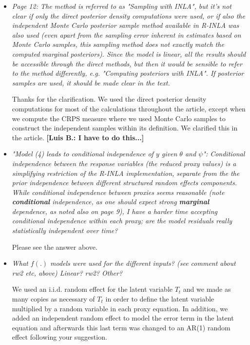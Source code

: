 \documentclass[11pt]{article}
\newcommand{\lb}[1]{\color{ForestGreen}\textbf{[Luis B.: #1]}\normalcolor}
\begin{document}
\begin{itemize}
\item \textit{Page 12: The method is referred to as "Sampling with INLA", but it's
  not clear if only the direct posterior density computations were
  used, or if also the independent Monte Carlo posterior sample method
  available in R-INLA was also used (even apart from the sampling
  error inherent in estimates based on Monte Carlo samples, this
  sampling method does not exactly match the computed marginal
  posteriors).  Since the model is linear, all the results should be
  accessible through the direct methods, but then it would be sensible
  to refer to the method differently, e.g. "Computing posteriors with
  INLA". If posterior samples are used, it should be made clear in the
  text.} 

Thanks for the clarification. We used the direct posterior density computations
for most of the calculations throughout the article, except when we compute the
CRPS measure where we used Monte Carlo samples to construct the independent
samples within its definition. We clarified this in the article. \lb{I have to do this...}  

\item \textit{"Model (4) leads to conditional independence of $y$ given $\theta$ and
  $\psi$": Conditional independence between the response variables (the
  reduced proxy values) is a simplifying restriction of the R-INLA
  implementation, separate from the the prior independence between
  different structured random effects components. While conditional
  independence between proxies seems reasonable (note \textbf{conditional}
  independence, as one should expect strong \textbf{marginal} dependence, as
  noted also on page 9), I have a harder time accepting conditional
  independence within each proxy; are the model residuals really
  statistically independent over time?}

Please see the answer above.

\item \textit{What $f(.)$ models were used for the different inputs? (see comment
  about rw2 etc, above) Linear? rw2? Other?}

We used an i.i.d. random effect for the latent variable $T_t$ and we made as
many copies as necessary of $T_t$ in order to define the latent variable
multiplied by a random variable in each proxy equation. In addition, we added an
independent random effect to model the error term in the latent equation and
afterwards this
last term was changed to an AR(1) random effect following your suggestion.  


\end{itemize}
\end{document}
